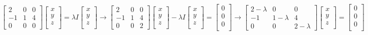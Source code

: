\documentclass[a4paper,12pt]{report}
\begin{document}
$\left [\begin{array}{rrr}
2&0&0\\
-1&1&4\\
0&0&0
\end{array}\right] 
\left[\begin{array}{rrr}
x\\
y\\
z\\
\end{array}\right] = \lambda I \left[\begin{array}{rrr}
x\\
y\\
z\\
\end{array}\right]
\rightarrow
\left [\begin{array}{rrr}
2&0&0\\
-1&1&4\\
0&0&2
\end{array}\right] 
\left[\begin{array}{rrr}
x\\
y\\
z\\
\end{array}\right] - \lambda I \left[\begin{array}{rrr}
x\\
y\\
z\\
\end{array}\right] = \left[\begin{array}{rrr}
0\\
0\\
0\\
\end{array}\right]
\rightarrow
\left [\begin{array}{rrr}
2-\lambda &0&0\\
-1&1-\lambda&4\\
0&0&2-\lambda
\end{array}\right] 
\left[\begin{array}{rrr}
x\\
y\\
z\\
\end{array}\right] = \left[\begin{array}{rrr}
0\\
0\\
0\\
\end{array}\right]$ \\
\end{document}
